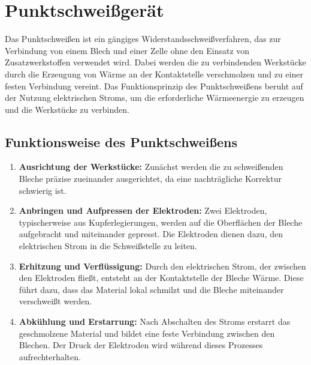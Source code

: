 

\section{Punktschweißgerät}

Das Punktschweißen ist ein gängiges Widerstandsschweißverfahren, das zur Verbindung von einem Blech und einer Zelle ohne den Einsatz von Zusatzwerkstoffen verwendet wird. Dabei werden die zu verbindenden Werkstücke durch die Erzeugung von Wärme an der Kontaktstelle verschmolzen und zu einer festen Verbindung vereint. Das Funktionsprinzip des Punktschweißens beruht auf der Nutzung elektrischen Stroms, um die erforderliche Wärmeenergie zu erzeugen und die Werkstücke zu verbinden.

\subsection{Funktionsweise des Punktschweißens}


\begin{enumerate}
    \item \textbf{Ausrichtung der Werkstücke:} Zunächst werden die zu schweißenden Bleche präzise zueinander ausgerichtet, da eine nachträgliche Korrektur schwierig ist.
    \item \textbf{Anbringen und Aufpressen der Elektroden:} Zwei Elektroden, typischerweise aus Kupferlegierungen, werden auf die Oberflächen der Bleche aufgebracht und miteinander gepresst. Die Elektroden dienen dazu, den elektrischen Strom in die Schweißstelle zu leiten.
    \item \textbf{Erhitzung und Verflüssigung:} Durch den elektrischen Strom, der zwischen den Elektroden fließt, entsteht an der Kontaktstelle der Bleche Wärme. Diese führt dazu, dass das Material lokal schmilzt und die Bleche miteinander verschweißt werden.
    \item \textbf{Abkühlung und Erstarrung:} Nach Abschalten des Stroms erstarrt das geschmolzene Material und bildet eine feste Verbindung zwischen den Blechen. Der Druck der Elektroden wird während dieses Prozesses aufrechterhalten.
\end{enumerate}

